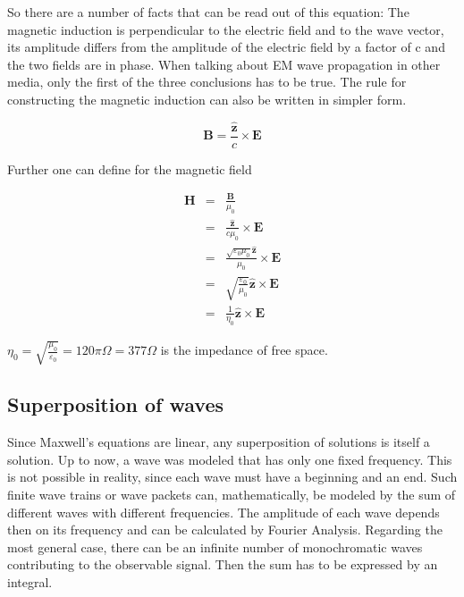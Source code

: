 \documentclass[a4paper,14pt]{extbook}
\begin{document}
So there are a number of facts that can be read out of this equation: The magnetic induction is perpendicular to the electric field and to the wave vector, its amplitude differs from the amplitude of the electric field by a factor of c and the two fields are in phase. When talking about EM wave propagation in other media, only the first of the three conclusions has to be true. The rule for constructing the magnetic induction can also be written in simpler form.

\begin{equation}\label{plane_wave_B_simpli}
\textbf{B}=\frac{\mathbf{\hat{z}}}{c}\times \mathbf{E}
\end{equation}

Further one can define for the magnetic field

\begin{eqnarray}
\textbf{H} &=&\frac{\mathbf{B}}{\mu_0}\label{plane_wave_H_simpli}\\
&=& \frac{\mathbf{\hat{z}}}{c \mu_0}\times \mathbf{E}\nonumber \\
&=& \frac{\sqrt{\varepsilon_0 \mu_0 }\mathbf{ \hat{z}}}{\mu_0}\times \mathbf{E}\nonumber \\
&=& \sqrt{\frac{\varepsilon_0}{\mu_0 }}\mathbf{ \hat{z}}\times \mathbf{E}\nonumber \\
&=& \frac{1}{\eta_0}\mathbf{ \hat{z}}\times \mathbf{E} \nonumber
\end{eqnarray}

$\eta_0 = \sqrt{\frac{\mu_0}{\varepsilon_0 }} = 120 \pi \Omega = 377 \Omega$ is the impedance of free space.

\subsection{Superposition of waves}
Since Maxwell's equations are linear, any superposition of solutions is itself a solution. Up to now, a wave was modeled that has only one fixed frequency. This is not possible in reality, since each wave must have a beginning and an end. Such finite wave trains or wave packets can, mathematically, be modeled by the sum of different waves with
different frequencies. The amplitude of each wave depends then on its frequency and can be calculated by Fourier Analysis. Regarding the most general case, there can be an infinite number of monochromatic waves contributing to the observable signal. Then the sum has to be expressed by an integral.
\end{document}
